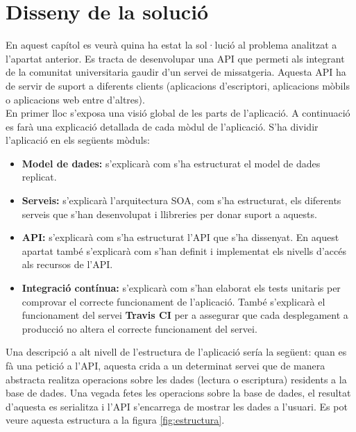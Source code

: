 \chapter{Disseny de la solució}\label{disseny}
En aquest capítol es veurà quina ha estat la sol·lució al problema analitzat a l'apartat anterior. Es tracta de desenvolupar una \ac{API} que permeti als integrant de la comunitat universitaria gaudir d'un servei de missatgeria. Aquesta \ac{API} ha de servir de suport a diferents clients (aplicacions d'escriptori, aplicacions mòbils o aplicacions web entre d'altres). \\

En primer lloc s'exposa una visió global de les parts de l'aplicació. A continuació es farà una explicació detallada de cada mòdul de l'aplicació. S'ha dividir l'aplicació en els següents mòduls: 
\begin{itemize}

	\item \textbf{Model de dades:} s'explicarà com s'ha estructurat el model de dades replicat.
	\item \textbf{Serveis:} s'explicarà l'arquitectura \ac{SOA}, com s'ha estructurat, els diferents serveis que s'han desenvolupat i llibreries per donar suport a aquests.
	\item \textbf{\ac{API}:} s'explicarà com s'ha estructurat l'\ac{API} que s'ha dissenyat. En aquest apartat també s'explicarà com s'han definit i implementat els nivells d'accés als recursos de l'\ac{API}.
	\item \textbf{Integració contínua:} s'explicarà com s'han elaborat els tests unitaris per comprovar el correcte funcionament de l'aplicació. També s'explicarà el funcionament del servei \textbf{Travis CI} per a assegurar que cada desplegament a producció no altera el correcte funcionament del servei.
	
\end{itemize}

Una descripció a alt nivell de l'estructura de l'aplicació sería la següent: quan es fà una petició a l'\ac{API}, aquesta crida a un determinat servei que de manera abstracta realitza operacions sobre les dades (lectura o escriptura) residents a la base de dades. Una vegada fetes les operacions sobre la base de dades, el resultat d'aquesta es serialitza i l'\ac{API} s'encarrega de mostrar les dades a l'usuari. Es pot veure aquesta estructura a la figura \ref{fig:estructura}.

